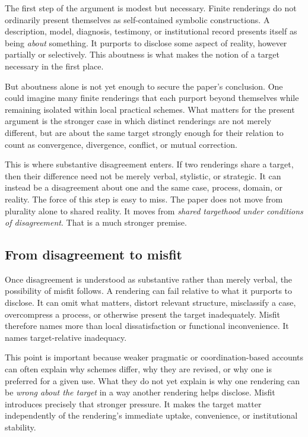 \documentclass[11pt]{article}
\renewcommand{\emph}[1]{\textit{#1}}
\begin{document}
The first step of the argument is modest but necessary. Finite renderings do not ordinarily present themselves as self-contained symbolic constructions. A description, model, diagnosis, testimony, or institutional record presents itself as being \emph{about} something. It purports to disclose some aspect of reality, however partially or selectively. This aboutness is what makes the notion of a target necessary in the first place.

But aboutness alone is not yet enough to secure the paper's conclusion. One could imagine many finite renderings that each purport beyond themselves while remaining isolated within local practical schemes. What matters for the present argument is the stronger case in which distinct renderings are not merely different, but are about the same target strongly enough for their relation to count as convergence, divergence, conflict, or mutual correction.

This is where substantive disagreement enters. If two renderings share a target, then their difference need not be merely verbal, stylistic, or strategic. It can instead be a disagreement about one and the same case, process, domain, or reality. The force of this step is easy to miss. The paper does not move from plurality alone to shared reality. It moves from \emph{shared targethood under conditions of disagreement}. That is a much stronger premise.

\subsection{From disagreement to misfit}

Once disagreement is understood as substantive rather than merely verbal, the possibility of misfit follows. A rendering can fail relative to what it purports to disclose. It can omit what matters, distort relevant structure, misclassify a case, overcompress a process, or otherwise present the target inadequately. Misfit therefore names more than local dissatisfaction or functional inconvenience. It names target-relative inadequacy.

This point is important because weaker pragmatic or coordination-based accounts can often explain why schemes differ, why they are revised, or why one is preferred for a given use. What they do not yet explain is why one rendering can be \emph{wrong about the target} in a way another rendering helps disclose. Misfit introduces precisely that stronger pressure. It makes the target matter independently of the rendering's immediate uptake, convenience, or institutional stability.
\end{document}
